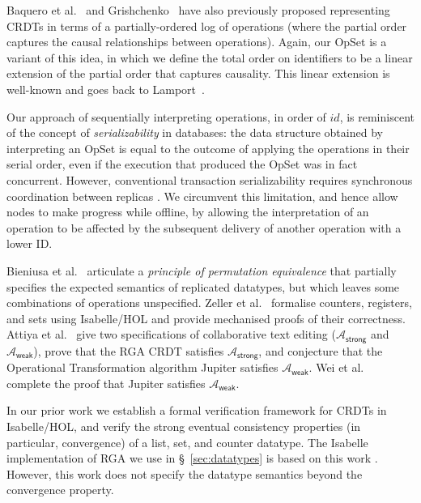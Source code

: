 Baquero et al.~\cite{Baquero:2014ed} and Grishchenko~\cite{Grishchenko:2014eh} have also previously proposed representing CRDTs in terms of a partially-ordered log of operations (where the partial order captures the causal relationships between operations).
Again, our OpSet is a variant of this idea, in which we define the total order on identifiers to be a linear extension of the partial order that captures causality.
This linear extension is well-known and goes back to Lamport~\cite{Lamport:1978jq}.

Our approach of sequentially interpreting operations, in order of $\mathit{id}$, is reminiscent of the concept of \emph{serializability} in databases: the data structure obtained by interpreting an OpSet is equal to the outcome of applying the operations in their serial order, even if the execution that produced the OpSet was in fact concurrent.
However, conventional transaction serializability requires synchronous coordination between replicas \cite{Davidson:1985hv}.
We circumvent this limitation, and hence allow nodes to make progress while offline, by allowing the interpretation of an operation to be affected by the subsequent delivery of another operation with a lower ID.

Bieniusa et al.~\cite{Bieniusa:2012gt} articulate a \emph{principle of permutation equivalence} that partially specifies the expected semantics of replicated datatypes, but which leaves some combinations of operations unspecified.
Zeller et al.~\cite{Zeller:2014fl} formalise counters, registers, and sets using Isabelle/HOL and provide mechanised proofs of their correctness.
Attiya et al.~\cite{Attiya:2016kh} give two specifications of collaborative text editing ($\mathcal{A}_\textsf{strong}$ and $\mathcal{A}_\textsf{weak}$), prove that the RGA CRDT \cite{Roh:2011dw} satisfies $\mathcal{A}_\textsf{strong}$, and conjecture that the Operational Transformation algorithm Jupiter \cite{Nichols:1995fd} satisfies $\mathcal{A}_\textsf{weak}$.
Wei et al.~\cite{Wei:2017tg} complete the proof that Jupiter satisfies $\mathcal{A}_\textsf{weak}$.

In our prior work \cite{Gomes:2017gy} we establish a formal verification framework for CRDTs in Isabelle/HOL, and verify the strong eventual consistency properties (in particular, convergence) of a list, set, and counter datatype.
The Isabelle implementation of RGA we use in \S~\ref{sec:datatypes} is based on this work \cite{Gomes:2017vo}.
However, this work does not specify the datatype semantics beyond the convergence property.

